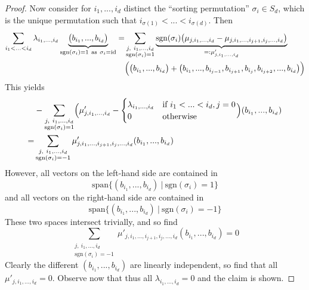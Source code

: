 \documentclass{scrartcl}
\newcommand{\sgn}{\mathrm{sgn}}
\newcommand{\vspan}{\mathrm{span}}
\theoremstyle{definition}
\begin{document}
\begin{proof}
    Now consider for $i_1, ..., i_d$ distinct the ``sorting permutation'' $\sigma_i \in S_d$, which is the unique permutation such that $i_{\sigma(1)} < ... < i_{\sigma(d)}$.
    Then
    \begin{align*}
        \sum_{i_1 < ... < i_d} \lambda_{i_1, ..., i_d} \underbrace{\bigl( b_{i_1}, ..., b_{i_d} \bigr)}_{\sgn(\sigma_i) = 1 \ \text{as} \ \sigma_i = \mathrm{id}} = &\sum_{\substack{j, \ i_1, ..., i_d\\\sgn(\sigma_i) = 1}} \underbrace{\sgn(\sigma_i) \bigl( \mu_{j, i_1, ..., i_d} - \mu_{j, i_1, ..., i_{j + 1}, i_j, ..., i_d} \bigr)}_{=: \mu'_{j, i_1, ..., i_d}} \\
        &\Bigl( \bigl( b_{i_1}, ..., b_{i_d} \bigr) + \bigl( b_{i_1}, ..., b_{i_{j - 1}}, b_{i_{j + 1}}, b_{i_j}, b_{i_{j + 2}}, ..., b_{i_d} \bigr) \Bigr)
    \end{align*}
    This yields
    \begin{align*}
        &-\sum_{\substack{j, \ i_1, ..., i_d\\\sgn(\sigma_i) = 1}} \Bigl( \mu'_{j, i_1, ..., i_d} - \begin{cases}
            \lambda_{i_1, ..., i_d} & \text{if $i_1 < ... < i_d, j = 0$} \\
            0 & \text{otherwise}
        \end{cases} \Bigr) (b_{i_1}, ..., b_{i_d}) \\
        =& \sum_{\substack{j, \ i_1, ..., i_d\\\sgn(\sigma_i) = -1}} \mu'_{j, i_1, ..., i_{j + 1}, i_j, ..., i_d} (b_{i_1}, ..., b_{i_d})
    \end{align*}
    However, all vectors on the left-hand side are contained in
    \begin{equation*}
        \vspan \{(b_{i_1}, ..., b_{i_d}) \ | \ \sgn(\sigma_i) = 1 \}
    \end{equation*}
    and all vectors on the right-hand side are contained in
    \begin{equation*}
        \vspan \{(b_{i_1}, ..., b_{i_d}) \ | \ \sgn(\sigma_i) = -1 \}
    \end{equation*}
    These two spaces intersect trivially, and so find
    \begin{equation*}
        \sum_{\substack{j, \ i_1, ..., i_d\\\sgn(\sigma_i) = -1}} \mu'_{j, i_1, ..., i_{j + 1}, i_j, ..., i_d} (b_{i_1}, ..., b_{i_d}) = 0
    \end{equation*}
    Clearly the different $(b_{i_1}, ..., b_{i_d})$ are linearly independent, so find that all $\mu'_{j, i_1, ..., i_d} = 0$.
    Observe now that thus all $\lambda_{i_1, ..., i_d} = 0$ and the claim is shown.
\end{proof}
\end{document}
